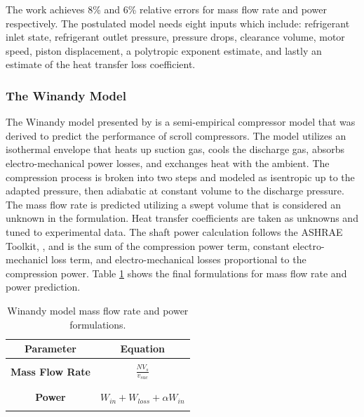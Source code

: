 \documentclass[preprint,11pt,authoryear]{elsarticle}
\begin{document}
The work achieves 8\% and 6\% relative errors for mass flow rate and power respectively. The postulated model needs eight inputs which include: refrigerant inlet state, refrigerant outlet pressure, pressure drops, clearance volume, motor speed, piston displacement, 
a polytropic exponent estimate, and lastly an estimate of the heat transfer loss coefficient.

\subsubsection{The Winandy Model}

The Winandy model presented by \cite{Winandy_scr} is a semi-empirical compressor model that was derived to predict the performance of scroll compressors. The model utilizes an isothermal envelope that heats up suction gas, cools the discharge gas, absorbs electro-mechanical power losses, and exchanges heat with the ambient. The compression process is broken into two steps and modeled as isentropic up to the adapted pressure, then adiabatic at constant volume to the discharge pressure. The mass flow rate is predicted utilizing a swept volume that is considered an unknown in the formulation. Heat transfer coefficients are taken as unknowns and tuned to experimental data. The shaft power calculation follows the ASHRAE Toolkit, \cite{Toolkit}, and is the sum of the compression power term, constant electro-mechanicl loss term, and electro-mechanical losses proportional to the compression power. Table \ref{Tab:win_eqs} shows the final formulations for mass flow rate and power prediction. 

\begin{table}[h]
\caption{Winandy model mass flow rate and power formulations.}
\label{Tab:win_eqs}
\begin{center}
\begin{tabular}{c c}
\hline
\hline
\textbf{Parameter} & Equation \\
\hline
\hline 
\\[-3ex] %
\textbf{Mass Flow Rate} & \(\displaystyle \frac{NV_s}{v_{suc}}\) \\
\\[-3ex] %
\hline %
\\[-3ex] %
\textbf{Power} & \(\displaystyle W_{in} + W_{loss} + \alpha W_{in} \)
\\
\\[-3ex] %
\hline
\hline
\end{tabular}
\end{center}
\end{table}
\end{document}
